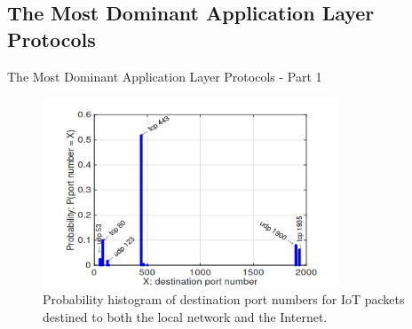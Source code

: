 \documentclass[10pt]{beamer}
\begin{document}
\subsection{The Most Dominant Application Layer Protocols}
\begin{frame}{The Most Dominant Application Layer Protocols - Part 1}

\begin{figure}
  \includegraphics[width=250pt]{PacketType.png}
  \caption{Probability histogram of destination port numbers for IoT packets destined to both the local network and the Internet.}
\end{figure}

\end{frame} 
\end{document}
